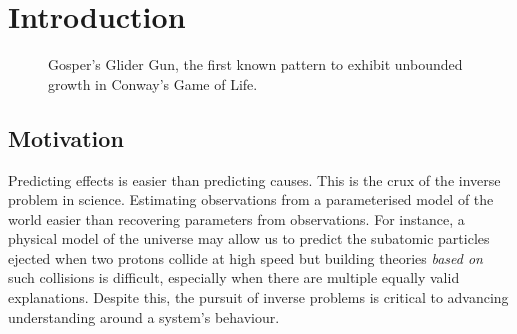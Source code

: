 \chapter{Introduction}

\begin{figure}[!h]
\centering
            \hfill
            \hfill
            \hfill
            \hfill
            \caption{Gosper's Glider Gun, the first known pattern to exhibit unbounded growth in Conway's Game of Life.\cite{hickerson}}
\label{fig:gospers-glider}
\end{figure}

\section{Motivation}
Predicting effects is easier than predicting causes. This is the crux of the inverse problem in science. Estimating observations from a parameterised model of the world easier than recovering parameters from observations. For instance, a physical model of the universe may allow us to predict the subatomic particles ejected when two protons collide at high speed but building theories \textit{based on} such collisions is difficult, especially when there are multiple equally valid explanations. Despite this, the pursuit of inverse problems is critical to advancing understanding around a system's behaviour.\\

